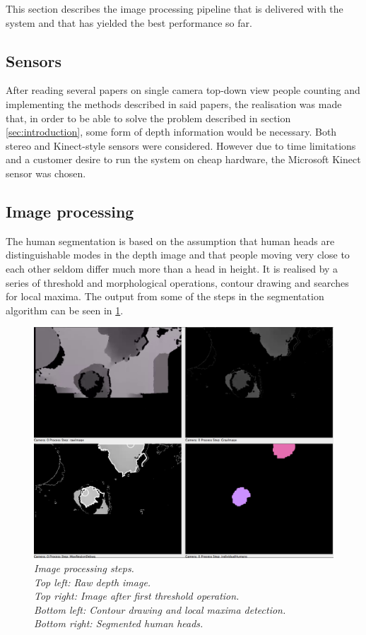 This section describes the image processing pipeline that is delivered with the system and that has yielded the best performance so far.

\subsection{Sensors}
After reading several papers on single camera top-down view people counting and implementing the methods described in said papers, the realisation was made that, in order to be able to solve the problem described in section \ref{sec:introduction}, some form of depth information would be necessary. Both stereo and Kinect-style sensors were considered. However due to time limitations and a customer desire to run the system on cheap hardware, the Microsoft Kinect sensor was chosen.

\subsection{Image processing}
The human segmentation is based on the assumption that human heads are distinguishable modes in the depth image and that people moving very close to each other seldom differ much more than a head in height. It is realised by a series of threshold and morphological operations, contour drawing and searches for local maxima. The output from some of the steps in the segmentation algorithm can be seen in \ref{fig:image_processing_steps}.

\begin{figure}[htb]
	\centering
	\includegraphics[width=\linewidth]{images/image_processing_steps.png}
	\caption[Image processing steps]{\textit{Image processing steps.\\
		Top left: Raw depth image.\\ 
		Top right: Image after first threshold operation.\\ 
		Bottom left: Contour drawing and local maxima detection.\\ 
		Bottom right: Segmented human heads.}}
	\label{fig:image_processing_steps}  %
\end{figure}

